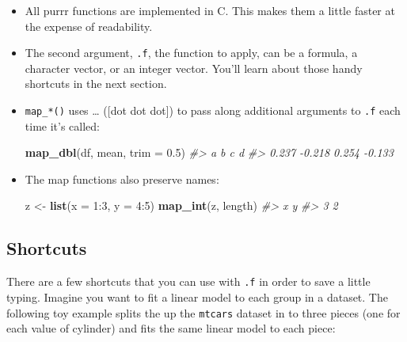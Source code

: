 \documentclass[]{book}
\newenvironment{Shaded}{\begin{snugshade}}{\end{snugshade}}
\newcommand{\KeywordTok}[1]{\textcolor[rgb]{0.13,0.29,0.53}{\textbf{{#1}}}}
\newcommand{\DataTypeTok}[1]{\textcolor[rgb]{0.13,0.29,0.53}{{#1}}}
\newcommand{\DecValTok}[1]{\textcolor[rgb]{0.00,0.00,0.81}{{#1}}}
\newcommand{\FloatTok}[1]{\textcolor[rgb]{0.00,0.00,0.81}{{#1}}}
\newcommand{\StringTok}[1]{\textcolor[rgb]{0.31,0.60,0.02}{{#1}}}
\newcommand{\CommentTok}[1]{\textcolor[rgb]{0.56,0.35,0.01}{\textit{{#1}}}}
\newcommand{\NormalTok}[1]{{#1}}
\begin{document}
\begin{itemize}
\item
  All purrr functions are implemented in C. This makes them a little
  faster at the expense of readability.
\item
  The second argument, \texttt{.f}, the function to apply, can be a
  formula, a character vector, or an integer vector. You'll learn about
  those handy shortcuts in the next section.
\item
  \texttt{map\_*()} uses \ldots{} ({[}dot dot dot{]}) to pass along
  additional arguments to \texttt{.f} each time it's called:

\begin{Shaded}
\begin{Highlighting}[]
\KeywordTok{map_dbl}\NormalTok{(df, mean, }\DataTypeTok{trim =} \FloatTok{0.5}\NormalTok{)}
\CommentTok{#>      a      b      c      d }
\CommentTok{#>  0.237 -0.218  0.254 -0.133}
\end{Highlighting}
\end{Shaded}
\item
  The map functions also preserve names:

\begin{Shaded}
\begin{Highlighting}[]
\NormalTok{z <-}\StringTok{ }\KeywordTok{list}\NormalTok{(}\DataTypeTok{x =} \DecValTok{1}\NormalTok{:}\DecValTok{3}\NormalTok{, }\DataTypeTok{y =} \DecValTok{4}\NormalTok{:}\DecValTok{5}\NormalTok{)}
\KeywordTok{map_int}\NormalTok{(z, length)}
\CommentTok{#> x y }
\CommentTok{#> 3 2}
\end{Highlighting}
\end{Shaded}
\end{itemize}

\subsection{Shortcuts}\label{shortcuts}

There are a few shortcuts that you can use with \texttt{.f} in order to
save a little typing. Imagine you want to fit a linear model to each
group in a dataset. The following toy example splits the up the
\texttt{mtcars} dataset in to three pieces (one for each value of
cylinder) and fits the same linear model to each piece:

\begin{Shaded}
\end{Shaded}
\end{document}
